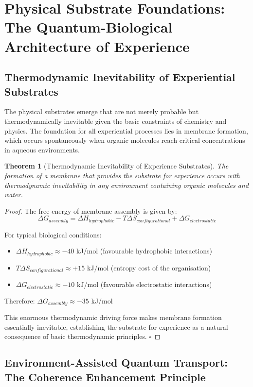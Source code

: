 \documentclass{article}
\newtheorem{theorem}{Theorem}[section]
\begin{document}
\section{Physical Substrate Foundations: The Quantum-Biological Architecture of Experience}

\subsection{Thermodynamic Inevitability of Experiential Substrates}

The physical substrates emerge that are not merely probable but thermodynamically inevitable given the basic constraints of chemistry and physics. The foundation for all experiential processes lies in membrane formation, which occurs spontaneously when organic molecules reach critical concentrations in aqueous environments.

\begin{theorem}[Thermodynamic Inevitability of Experience Substrates]
The formation of a membrane that provides the substrate for experience occurs with thermodynamic inevitability in any environment containing organic molecules and water.
\end{theorem}

\begin{proof}
The free energy of membrane assembly is given by:
$$\Delta G_{assembly} = \Delta H_{hydrophobic} - T\Delta S_{configurational} + \Delta G_{electrostatic}$$

For typical biological conditions:
\begin{itemize}
\item $\Delta H_{hydrophobic} \approx -40$ kJ/mol (favourable hydrophobic interactions)
\item $T\Delta S_{configurational} \approx +15$ kJ/mol (entropy cost of the organisation) 
\item $\Delta G_{electrostatic} \approx -10$ kJ/mol (favourable electrostatic interactions)
\end{itemize}

Therefore: $\Delta G_{assembly} \approx -35$ kJ/mol

This enormous thermodynamic driving force makes membrane formation essentially inevitable, establishing the substrate for experience as a natural consequence of basic thermodynamic principles. $\square$
\end{proof}

\subsection{Environment-Assisted Quantum Transport: The Coherence Enhancement Principle}
\end{document}
